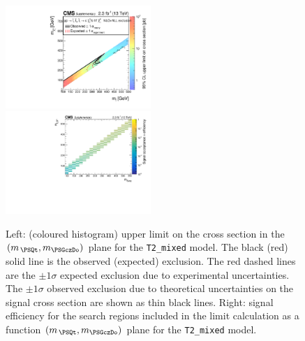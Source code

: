 \clearpage
\begin{figure}[t]
  \begin{center}
    \includegraphics[width=0.49\textwidth]{RA1T2mixedXSEC_aux} \, 
    \includegraphics[width=0.49\textwidth]{T2mixed_merging_4_cats_aux} \,     
  \end{center}
  \caption{Left: (coloured histogram) upper limit on the cross section in the $(m_{\,\PSQt}, m_{\PSGczDo})$ plane for the \texttt{T2\_mixed} model. 
  The black (red) solid line is the observed (expected) exclusion. The red dashed lines are the $\pm1\sigma$ expected exclusion due to experimental uncertainties. 
  The $\pm1\sigma$ observed exclusion due to theoretical uncertainties on the signal cross section are shown as thin black lines. 
  Right: signal efficiency for the search regions included in the limit calculation as a function $(m_{\,\PSQt}, m_{\PSGczDo})$ plane for the \texttt{T2\_mixed} model. 
  \label{fig:T2mixed_excl}}
\end{figure}

